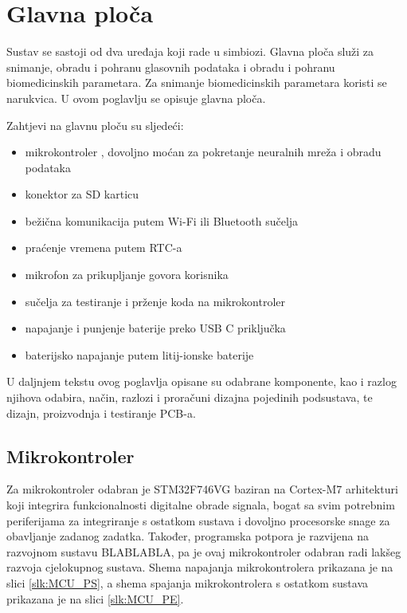 \chapter{Glavna ploča}
\label{pog:mainboard}

Sustav se sastoji od dva uređaja koji rade u simbiozi. Glavna ploča služi za snimanje, obradu i pohranu glasovnih podataka i obradu i pohranu biomedicinskih parametara. Za snimanje biomedicinskih parametara koristi se narukvica. U ovom poglavlju se opisuje glavna ploča.

Zahtjevi na glavnu ploču su sljedeći:
\begin{itemize}
    \item mikrokontroler , dovoljno moćan za pokretanje neuralnih mreža i obradu podataka
    \item konektor za SD karticu
    \item bežična komunikacija putem Wi-Fi ili Bluetooth sučelja
    \item praćenje vremena putem RTC-a
    \item mikrofon za prikupljanje govora korisnika
    \item sučelja za testiranje i prženje koda na mikrokontroler
    \item napajanje i punjenje baterije preko USB C priključka
    \item baterijsko napajanje putem litij-ionske baterije
\end{itemize}
U daljnjem tekstu ovog poglavlja opisane su odabrane komponente, kao i razlog njihova odabira, način, razlozi i proračuni dizajna pojedinih podsustava, te dizajn, proizvodnja i testiranje PCB-a.

\section{Mikrokontroler}
Za mikrokontroler odabran je STM32F746VG baziran na Cortex-M7 arhitekturi koji integrira funkcionalnosti digitalne obrade signala, bogat sa svim potrebnim periferijama za integriranje s ostatkom sustava i dovoljno procesorske snage za obavljanje zadanog zadatka. Također, programska potpora je razvijena na razvojnom sustavu BLABLABLA, pa je ovaj mikrokontroler odabran radi lakšeg razvoja cjelokupnog sustava. Shema napajanja mikrokontrolera prikazana je na slici \ref{slk:MCU_PS}, a shema spajanja mikrokontrolera s ostatkom sustava prikazana je na slici \ref{slk:MCU_PE}.

